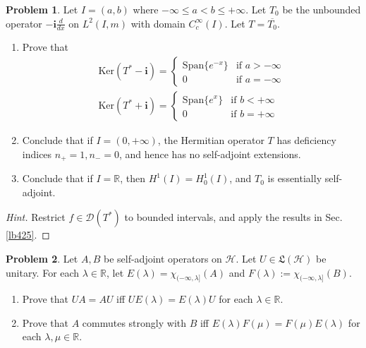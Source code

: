 \documentclass[12pt,b5paper,notitlepage]{article}
\theoremstyle{definition}
\newtheorem{prob}{\color{red}Problem}[section]
\theoremstyle{plain}
\newcommand{\fk}{\mathfrak}
\newcommand{\ovl}{\overline}
\newcommand{\Dom}{\mathscr{D}}
\newcommand{\Span}{\mathrm{Span}}
\newcommand{\im}{\mathbf{i}}
\newcommand{\Rbb}{\mathbb R}
\newcommand{\Ker}{\mathrm{Ker}}
\newcommand{\MH}{\mathcal H}
\numberwithin{equation}{section}
\begin{document}
\begin{prob}
Let $I=(a,b)$ where $-\infty\leq a<b\leq+\infty$. Let $T_0$ be the unbounded operator $-\im\frac d{dx}$ on $L^2(I,m)$ with domain $C_c^\infty(I)$. Let $T=\ovl {T_0}$.
\begin{enumerate}
\item Prove that 
\begin{gather*}
\Ker(T^*-\im)=\left\{\begin{array}{ll}
\Span\{e^{-x}\}&\text{if }a>-\infty\\[0.5ex]
0&\text{if }a=-\infty
\end{array}
\right.\\[0.5ex]
\Ker(T^*+\im)=\left\{\begin{array}{ll}
\Span\{e^{x}\}&\text{if }b<+\infty\\[0.5ex]
0&\text{if }b=+\infty
\end{array}
\right.
\end{gather*}
\item Conclude that if $I=(0,+\infty)$, the Hermitian operator $T$ has deficiency indices $n_+=1,n_-=0$, and hence has no self-adjoint extensions.
\item Conclude that if $I=\Rbb$, then $H^1(I)=H^1_0(I)$, and $T_0$ is essentially self-adjoint.
\end{enumerate}
\end{prob}

\begin{proof}[Hint]
Restrict $f\in\Dom(T^*)$ to bounded intervals, and apply the results in Sec. \ref{lb425}.
\end{proof}


\begin{prob}
Let $A,B$ be self-adjoint operators on $\MH$. Let $U\in\fk L(\MH)$ be unitary. For each $\lambda\in\Rbb$, let $E(\lambda)=\chi_{(-\infty,\lambda]}(A)$ and $F(\lambda):=\chi_{(-\infty,\lambda]}(B)$.
\begin{enumerate}
\item Prove that $UA=AU$ iff $UE(\lambda)=E(\lambda)U$ for each $\lambda\in\Rbb$.
\item Prove that $A$ commutes strongly with $B$ iff $E(\lambda)F(\mu)=F(\mu)E(\lambda)$ for each $\lambda,\mu\in\Rbb$.
\end{enumerate}
\end{prob}








\newpage
\end{document}
